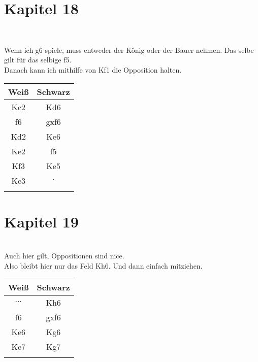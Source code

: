 \section{Kapitel 18}
\\
\links

Wenn ich g6 spiele, muss entweder der König oder der Bauer nehmen. Das selbe gilt für das selbige f5. \\
Danach kann ich mithilfe von Kf1 die Opposition halten.\\

\centering
\begin{tabular}[h]{c|c}
	\textbf{Weiß}  & \textbf{Schwarz} \\
	\hline
	Kc2 & Kd6 \\
	f6 & gxf6 \\
	Kd2 & Ke6 \\
	Ke2 & f5 \\
	Kf3 & Ke5 \\
	Ke3 & $\cdot$ \\
	\unterstreichen{\Remis} & \unterstreichen{\Remis}
\end{tabular}


\section{Kapitel 19}
\\
\links
Auch hier gilt, Oppositionen sind nice.\\
Also bleibt hier nur das Feld Kh6. Und dann einfach mitziehen. \\

\centering
\begin{tabular}[h]{c|c}
	\textbf{Weiß}  & \textbf{Schwarz} \\
	\hline
	$\cdots$ & Kh6\\
	f6 & gxf6 \\
	Ke6 & Kg6 \\
	Ke7 & Kg7 \\
	\unterstreichen{\Remis} & \unterstreichen{\Remis}
\end{tabular}
